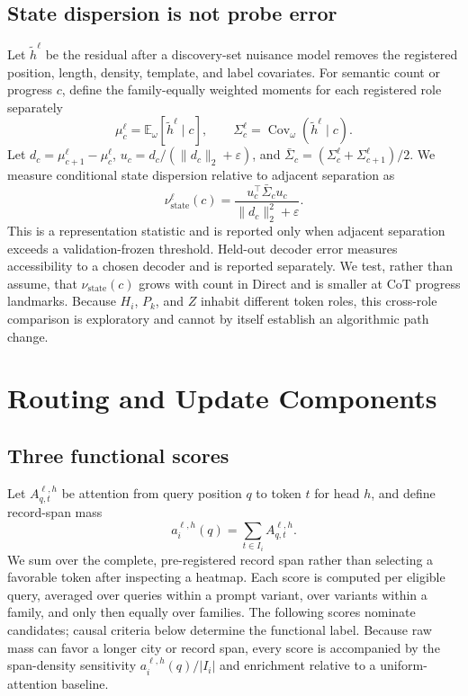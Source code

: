 \documentclass[10pt,twocolumn]{article}
\newcommand{\E}{\mathbb{E}}
\newcommand{\eps}{\varepsilon}
\begin{document}
\subsection{State dispersion is not probe error}
Let $\widetilde h^\ell$ be the residual after a discovery-set nuisance model removes the
registered position, length, density, template, and label covariates. For semantic count or
progress $c$, define the family-equally weighted moments for each registered role separately
\[
 \mu_c^\ell=\E_{\omega}[\widetilde h^\ell\mid c],\qquad
 \Sigma_c^\ell=\operatorname{Cov}_{\omega}(\widetilde h^\ell\mid c).
\]
Let $d_c=\mu_{c+1}^\ell-\mu_c^\ell$,
$u_c=d_c/(\|d_c\|_2+\eps)$, and
$\bar\Sigma_c=(\Sigma_c^\ell+\Sigma_{c+1}^\ell)/2$. We measure conditional state dispersion
relative to adjacent separation as
\begin{equation}
 \nu_{\mathrm{state}}^\ell(c)=
 \frac{u_c^\top\bar\Sigma_c u_c}
      {\|d_c\|_2^2+\eps}.
 \label{eq:state-noise}
\end{equation}
This is a representation statistic and is reported only when adjacent separation exceeds a
validation-frozen threshold. Held-out decoder error measures accessibility to a chosen decoder
and is reported separately. We test, rather than assume, that
$\nu_{\mathrm{state}}(c)$ grows with count in Direct and is smaller at CoT progress landmarks.
Because $H_i$, $P_k$, and $Z$ inhabit different token roles, this cross-role comparison is
exploratory and cannot by itself establish an algorithmic path change.

\section{Routing and Update Components}
\subsection{Three functional scores}
Let $A_{q,t}^{\ell,h}$ be attention from query position $q$ to token $t$ for head $h$, and define
record-span mass
\[
 a_i^{\ell,h}(q)=\sum_{t\in I_i}A_{q,t}^{\ell,h}.
\]
We sum over the complete, pre-registered record span rather than selecting a favorable token
after inspecting a heatmap. Each score is computed per eligible query, averaged over queries
within a prompt variant, over variants within a family, and only then equally over families. The following scores nominate
candidates; causal criteria below determine the functional label. Because raw mass can favor a
longer city or record span, every score is accompanied by the span-density sensitivity
$a_i^{\ell,h}(q)/|I_i|$ and enrichment relative to a uniform-attention baseline.
\end{document}
